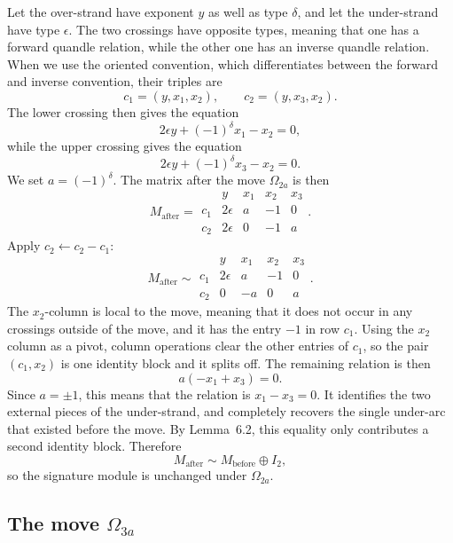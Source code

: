\documentclass[11pt]{article}
\theoremstyle{definition}
\begin{document}
Let the over-strand have exponent $y$ as well as type $\delta$, and let the under-strand have type $\epsilon$. The two crossings have opposite types, meaning that one has a forward quandle relation, while the other one has an inverse quandle relation. When we use the oriented convention, which differentiates between the forward and inverse convention, their triples are
\[
c_1=(y,x_1,x_2),
\qquad
c_2=(y,x_3,x_2).
\]
The lower crossing then gives the equation
\[
2\epsilon y+(-1)^\delta x_1-x_2=0,
\]
while the upper crossing gives the equation
\[
2\epsilon y+(-1)^\delta x_3-x_2=0.
\]
We set $a=(-1)^\delta$. The matrix after the move $\Omega_{2a}$ is then
\[
M_{\mathrm{after}}=
\begin{array}{c|cccc}
&y&x_1&x_2&x_3\\ \hline
c_1&2\epsilon&a&-1&0\\
c_2&2\epsilon&0&-1&a
\end{array}.
\]
Apply $c_2\leftarrow c_2-c_1$:
\[
M_{\mathrm{after}}\sim
\begin{array}{c|cccc}
&y&x_1&x_2&x_3\\ \hline
c_1&2\epsilon&a&-1&0\\
c_2&0&-a&0&a
\end{array}.
\]
The $x_2$-column is local to the move, meaning that it does not occur in any crossings outside of the move, and it has the entry $-1$ in row $c_1$. Using the $x_2$ column as a pivot, column operations clear the other entries of $c_1$, so the pair $(c_1,x_2)$ is one identity block and it splits off. The remaining relation is then
\[
a(-x_1+x_3)=0.
\]
Since $a=\pm1$, this means that the relation is $x_1-x_3=0$. It identifies the two external pieces of the under-strand, and completely recovers the single under-arc that existed before the move. By Lemma~6.2, this equality only contributes a second identity block. Therefore
\[
M_{\mathrm{after}}\sim M_{\mathrm{before}}\oplus I_2,
\]
so the signature module is unchanged under $\Omega_{2a}$.

\subsection{The move \texorpdfstring{$\Omega_{3a}$}{Omega 3a}}
\end{document}
